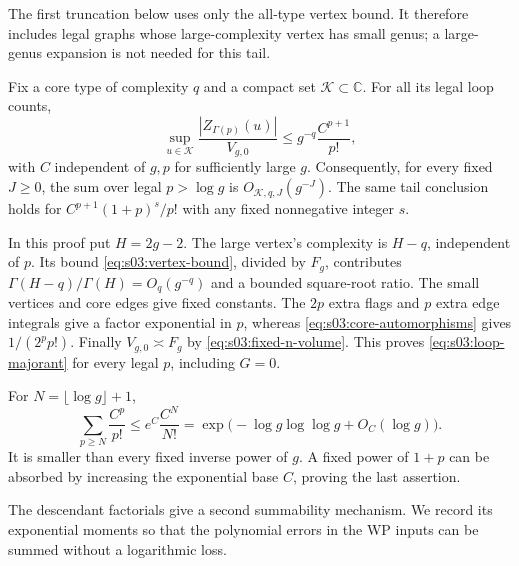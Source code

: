 The first truncation below uses only the all-type vertex bound. It
therefore includes legal graphs whose large-complexity vertex has
small genus; a large-genus expansion is not needed for this tail.

\begin{lmm}
\label{lmm:s03:loop-tail}
Fix a core type of complexity $q$ and a compact set
$\mathcal K\subset\mathbb C$. For all its legal loop counts,
\begin{equation}
\label{eq:s03:loop-majorant}
\sup_{u\in\mathcal K}
 \frac{|Z_{\Gamma(p)}(u)|}{V_{g,0}}
\leq g^{-q}\frac{C^{p+1}}{p!},
\end{equation}
with $C$ independent of $g,p$ for sufficiently large $g$.
Consequently, for every fixed $J\geq0$, the sum over legal
$p>\log g$ is $O_{\mathcal K,q,J}(g^{-J})$.
The same tail conclusion holds for $C^{p+1}(1+p)^s/p!$ with any
fixed nonnegative integer $s$.
\end{lmm}
\begin{prf}
In this proof put $H=2g-2$. The large vertex's complexity is
$H-q$, independent of $p$. Its bound
\eqref{eq:s03:vertex-bound}, divided by $F_g$, contributes
$\Gamma(H-q)/\Gamma(H)=O_q(g^{-q})$ and a bounded square-root
ratio. The small vertices and core edges give fixed constants.
The $2p$ extra flags and $p$ extra edge integrals give a factor
exponential in $p$, whereas \eqref{eq:s03:core-automorphisms}
gives $1/(2^pp!)$. Finally $V_{g,0}\asymp F_g$ by
\eqref{eq:s03:fixed-n-volume}. This proves
\eqref{eq:s03:loop-majorant} for every legal $p$, including $G=0$.

For $N=\lfloor\log g\rfloor+1$,
\[
\sum_{p\geq N}\frac{C^p}{p!}
\leq e^C\frac{C^N}{N!}
=\exp\bigl(-\log g\log\log g+O_C(\log g)\bigr).
\]
It is smaller than every fixed inverse power of $g$.
A fixed power of $1+p$ can be absorbed by increasing the exponential
base $C$, proving the last assertion.
\end{prf}

The descendant factorials give a second summability mechanism. We
record its exponential moments so that the polynomial errors in
the WP inputs can be summed without a logarithmic loss.

